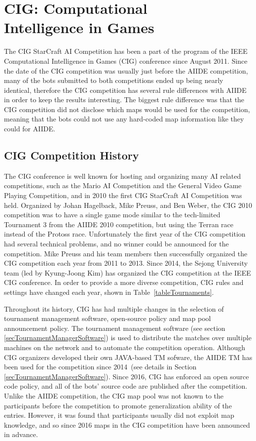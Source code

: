 \section{CIG: Computational\\ Intelligence in Games}\label{subsecCIG}

The CIG StarCraft AI Competition has been a part of the program of the IEEE Computational Intelligence in Games (CIG) conference since August 2011.  Since the date of the CIG competition was usually just before the AIIDE competition, many of the bots submitted to both competitions ended up being nearly identical, therefore the CIG competition has several rule differences with AIIDE in order to keep the results interesting. The biggest rule difference was that the CIG competition did not disclose which maps would be used for the competition, meaning that the bots could not use any hard-coded map information like they could for AIIDE.

\subsection{CIG Competition History}
The CIG conference is well known for hosting and organizing many AI related competitions, such as the Mario AI Competition and the General Video Game Playing Competition, and in 2010 the first CIG StarCraft AI Competition was held. Organized by Johan Hagelback, Mike Preuss, and Ben Weber, the CIG 2010 competition was to have a single game mode similar to the tech-limited Tournament 3 from the AIIDE 2010 competition, but using the Terran race instead of the Protoss race. Unfortunately the first year of the CIG competition had several technical problems, and no winner could be announced for the competition. Mike Preuss and his team members then successfully organized the CIG competition each year from 2011 to 2013. Since 2014, the Sejong University team (led by Kyung-Joong Kim) has organized the CIG  competition at the IEEE CIG conference. In order to provide a more diverse competition, CIG rules and settings have changed each year, shown in Table~\ref{tableTournaments}. 

Throughout its history, CIG has had multiple changes in the selection of tournament management software, open-source policy and map pool announcement policy. The tournament management software (see section \ref{secTournamentManagerSoftware}) is used to distribute the matches over multiple machines on the network and to automate the competition operation. Although CIG organizers developed their own JAVA-based TM sofware, the AIIDE TM has been used for the competition since 2014~(see details in Section \ref{secTournamentManagerSoftware}). Since 2016, CIG has enforced an open source code policy, and all of the bots' source code are published after the competition. Unlike the AIIDE competition, the CIG map pool was not known to the participants before the competition to promote generalization ability of the entries. However, it was found that participants usually did not exploit map knowledge, and so since 2016 maps in the CIG competition have been announced in advance. 
 
